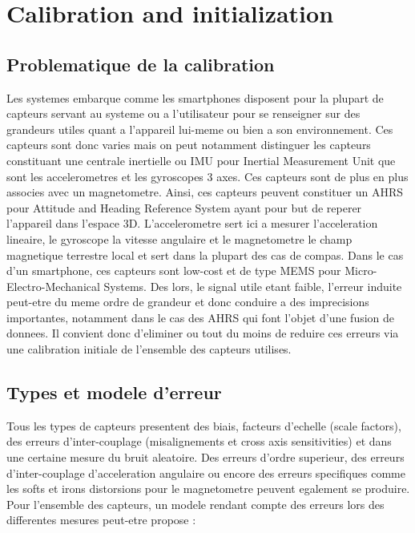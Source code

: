 \section{Calibration and initialization}

\subsection{Problematique de la calibration}

	Les systemes embarque comme les smartphones disposent pour la plupart de capteurs servant au systeme ou a l'utilisateur pour se renseigner sur des grandeurs utiles quant a l'appareil lui-meme ou bien a son environnement. Ces capteurs sont donc varies mais on peut notamment distinguer les capteurs constituant une centrale inertielle ou IMU pour Inertial Measurement Unit que sont les accelerometres et les gyroscopes 3 axes. Ces capteurs sont de plus en plus associes avec un magnetometre. Ainsi, ces capteurs peuvent constituer un AHRS pour Attitude and Heading Reference System ayant pour but de reperer l'appareil dans l'espace 3D. L'accelerometre sert ici a mesurer l'acceleration lineaire, le gyroscope la vitesse angulaire et le magnetometre le champ magnetique terrestre local et sert dans la plupart des cas de compas. Dans le cas d'un smartphone, ces capteurs sont low-cost et de type MEMS pour Micro-Electro-Mechanical Systems. Des lors, le signal utile etant faible, l'erreur induite peut-etre du meme ordre de grandeur et donc conduire a des imprecisions importantes, notamment dans le cas des AHRS qui font l'objet d'une fusion de donnees. Il convient donc d'eliminer ou tout du moins de reduire ces erreurs via une calibration initiale de l'ensemble des capteurs utilises.

\subsection{Types et modele d'erreur}

	Tous les types de capteurs presentent des biais, facteurs d'echelle (scale factors), des erreurs d'inter-couplage (misalignements et cross axis sensitivities) et dans une certaine mesure du bruit aleatoire. Des erreurs d'ordre superieur, des erreurs d'inter-couplage d'acceleration angulaire ou encore des erreurs specifiques comme les softs et irons distorsions pour le magnetometre peuvent egalement se produire.
Pour l'ensemble des capteurs, un modele rendant compte des erreurs lors des differentes mesures peut-etre propose :


